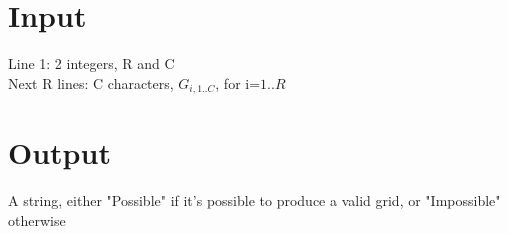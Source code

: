 



\section*{Input}
Line 1: 2 integers, R and C \\
Next R lines: C characters, $G_{i,1..C}$, for i=$1..R$ \\

\section*{Output}
A string, either "Possible" if it's possible to produce a valid grid, or "Impossible" otherwise
